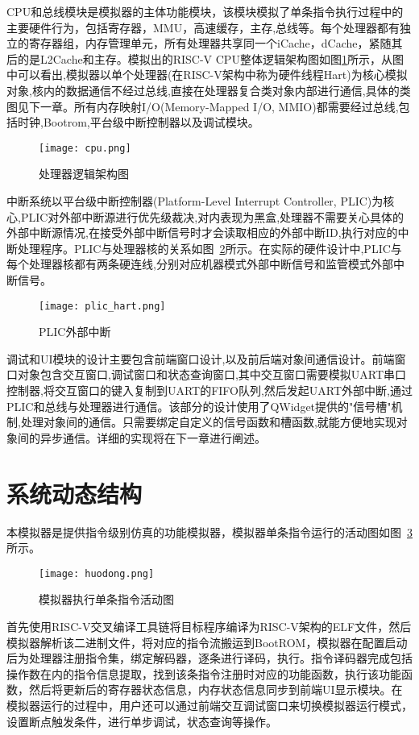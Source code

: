CPU和总线模块是模拟器的主体功能模块，该模块模拟了单条指令执行过程中的主要硬件行为，包括寄存器，MMU，高速缓存，主存,总线等。每个处理器都有独立的寄存器组，内存管理单元，所有处理器共享同一个iCache，dCache，紧随其后的是L2Cache和主存。模拟出的RISC-V CPU整体逻辑架构图如图\ref{fig:cpu}所示，从图中可以看出,模拟器以单个处理器(在RISC-V架构中称为硬件线程Hart)为核心模拟对象,核内的数据通信不经过总线,直接在处理器复合类对象内部进行通信,具体的类图见下一章。所有内存映射I/O(Memory-Mapped I/O, MMIO)都需要经过总线,包括时钟,Bootrom,平台级中断控制器以及调试模块。
\begin{figure}[H]
  \centering
  \texttt{[image: cpu.png]}
  \caption{处理器逻辑架构图}
  \label{fig:cpu}
\end{figure}


中断系统以平台级中断控制器(Platform-Level Interrupt Controller, PLIC)为核心,PLIC对外部中断源进行优先级裁决,对内表现为黑盒,处理器不需要关心具体的外部中断源情况,在接受外部中断信号时才会读取相应的外部中断ID,执行对应的中断处理程序。PLIC与处理器核的关系如图~\ref{fig:plic-to-hart}所示。在实际的硬件设计中,PLIC与每个处理器核都有两条硬连线,分别对应机器模式外部中断信号和监管模式外部中断信号。
\begin{figure}[H]
  \centering
  \texttt{[image: plic\_hart.png]}
  \caption{PLIC外部中断}
  \label{fig:plic-to-hart}
\end{figure}


调试和UI模块的设计主要包含前端窗口设计,以及前后端对象间通信设计。前端窗口对象包含交互窗口,调试窗口和状态查询窗口,其中交互窗口需要模拟UART串口控制器,将交互窗口的键入复制到UART的FIFO队列,然后发起UART外部中断,通过PLIC和总线与处理器进行通信。该部分的设计使用了QWidget提供的"信号槽"机制,处理对象间的通信。只需要绑定自定义的信号函数和槽函数,就能方便地实现对象间的异步通信。详细的实现将在下一章进行阐述。

\section{系统动态结构}
本模拟器是提供指令级别仿真的功能模拟器，模拟器单条指令运行的活动图如图~\ref{fig:sim-seq1}所示。
\begin{figure}[H]
  \centering
  \texttt{[image: huodong.png]}
  \caption{模拟器执行单条指令活动图}
  \label{fig:sim-seq1}
\end{figure}


首先使用RISC-V交叉编译工具链将目标程序编译为RISC-V架构的ELF文件，然后模拟器解析该二进制文件，将对应的指令流搬运到BootROM，模拟器在配置启动后为处理器注册指令集，绑定解码器，逐条进行译码，执行。指令译码器完成包括操作数在内的指令信息提取，找到该条指令注册时对应的功能函数，执行该功能函数，然后将更新后的寄存器状态信息，内存状态信息同步到前端UI显示模块。在模拟器运行的过程中，用户还可以通过前端交互调试窗口来切换模拟器运行模式，设置断点触发条件，进行单步调试，状态查询等操作。


